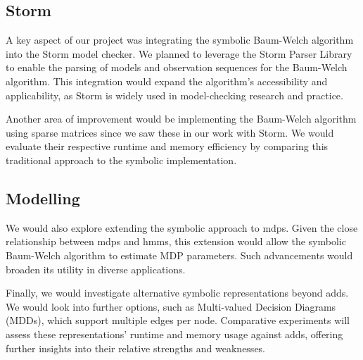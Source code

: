 \subsection{Storm}
A key aspect of our project was integrating the symbolic Baum-Welch algorithm into the Storm model checker. 
We planned to leverage the Storm Parser Library to enable the parsing of models and observation sequences for the Baum-Welch algorithm.
This integration would expand the algorithm's accessibility and applicability, as Storm is widely used in model-checking research and practice.

Another area of improvement would be implementing the Baum-Welch algorithm using sparse matrices since we saw these in our work with Storm. 
We would evaluate their respective runtime and memory efficiency by comparing this traditional approach to the symbolic implementation. 

\subsection{Modelling}
We would also explore extending the symbolic approach to \glspl{mdp}. 
Given the close relationship between \glspl{mdp} and \glspl{hmm}, this extension would allow the symbolic Baum-Welch algorithm to estimate MDP parameters. 
Such advancements would broaden its utility in diverse applications.

Finally, we would investigate alternative symbolic representations beyond \glspl{add}. We would look into further options, such as Multi-valued Decision Diagrams (MDDs), which support multiple edges per node.
Comparative experiments will assess these representations' runtime and memory usage against \glspl{add}, offering further insights into their relative strengths and weaknesses.